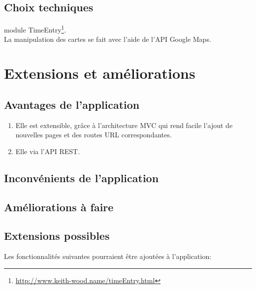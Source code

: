 \documentclass[11pt,a4paper,margin=0.5in]{report}
\begin{document}

\section{Choix techniques}


\vspace{0.5cm}

module TimeEntry\footnote{\url{http://www.keith-wood.name/timeEntry.html}}.\\[0.1in]
La manipulation des cartes se fait avec l'aide de l'API Google Maps.

\chapter{Extensions et améliorations}

\section{Avantages de l'application}
\begin{enumerate}
    \item Elle est extensible, grâce à l'architecture MVC qui rend facile l'ajout de nouvelles pages et des routes URL correspondantes.
    \item Elle via l'API REST.
\end{enumerate}

\section{Inconvénients de l'application}

\section{Améliorations à faire}

\section{Extensions possibles}
Les fonctionnalités suivantes pourraient être ajoutées à l'application:
\end{document}
